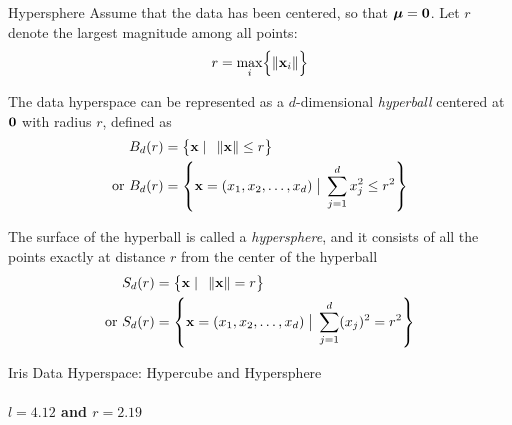 \begin{frame}{Hypersphere}
Assume that the data has been centered, so that
${\bm \mu} = \mathbf{0}$.
Let $r$ denote the largest magnitude among all points:
\begin{align*}
    r = \max_i \Bigl\{ \left\lVert\mathbf{x}_i\right\rVert \Bigr\}
\end{align*}

The data hyperspace can be represented as a
$d$-dimensional {\em hyperball}
centered at $\mathbf{0}$ with radius $r$, def\/{i}ned as
\begin{align*}
  B_d(r) & = \bigl\{ \mathbf{x}\; |\;\; \left\lVert\mathbf{x}\right\rVert \le r\bigr\}\\
  \text{or } B_d(r) & = \left\{
    \mathbf{x} = (x_1, x_2, \ldots, x_d) \; \big| \;
    \sum_{j=1}^{d} x_{j}^2 \le r^2
    \right\}
\end{align*}

The surface of the hyperball is called a {\em hypersphere},
and it consists of all the points exactly at distance $r$ from
the center of the hyperball
\begin{align*}
  S_d(r) & = \bigl\{ \mathbf{x}\; |\;\; \left\lVert\mathbf{x}\right\rVert = r\bigr\}\\
  \text{or } S_d(r) & = \left\{\mathbf{x} = (x_1, x_2, \ldots, x_d)
  \; \big| \;
  \sum_{j=1}^{d} (x_{j})^2 = r^2\right\}
\end{align*}
\end{frame}



\begin{frame}{Iris Data Hyperspace: Hypercube and Hypersphere}
  \framesubtitle{$\textit{l}=4.12$ and $\textit{r}=2.19$}
\centering
{}
\end{frame}


